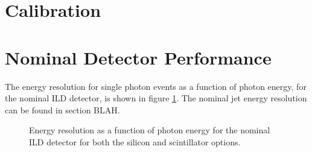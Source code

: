\section{Calibration}

\section{Nominal Detector Performance}
The energy resolution for single photon events as a function of photon energy, for the nominal ILD detector, is shown in figure \ref{fig:ecalnominalres}.  The nominal jet energy resolution can be found in section BLAH.

\begin{figure}
\centering
{}
\caption[Energy resolution as a function of photon energy for the nominal ILD detector for both the silicon and scintillator options.]{Energy resolution as a function of photon energy for the nominal ILD detector for both the silicon and scintillator options.}
\label{fig:ecalnominalres}
\end{figure}


